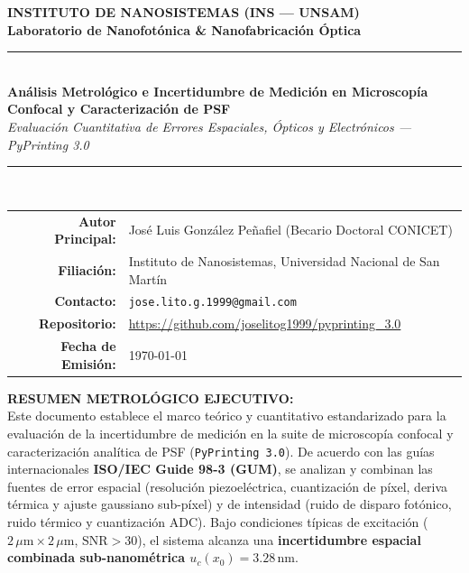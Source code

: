 \documentclass[11pt,a4paper]{article}
\begin{document}
\begin{center}
    {\Large \bfseries \color{NavyBlue} INSTITUTO DE NANOSISTEMAS (INS --- UNSAM)}\\[3pt]
    {\large \bfseries \color{MediumBlue} Laboratorio de Nanofotónica \& Nanofabricación Óptica}\\[8pt]
    \rule{\linewidth}{1.2pt}\\[10pt]
    {\LARGE \bfseries \color{NavyBlue} Análisis Metrológico e Incertidumbre de Medición en Microscopía Confocal y Caracterización de PSF}\\[6pt]
    {\large \itshape \color{TealAccent} Evaluación Cuantitativa de Errores Espaciales, Ópticos y Electrónicos --- PyPrinting 3.0}\\[10pt]
    \rule{\linewidth}{0.6pt}\\[8pt]
    
    \begin{tabular}{rl}
        \textbf{Autor Principal:} & José Luis González Peñafiel (Becario Doctoral CONICET) \\
        \textbf{Filiación:} & Instituto de Nanosistemas, Universidad Nacional de San Martín \\
        \textbf{Contacto:} & \texttt{jose.lito.g.1999@gmail.com} \\
        \textbf{Repositorio:} & \url{https://github.com/joselitog1999/pyprinting_3.0} \\
        \textbf{Fecha de Emisión:} & \today
    \end{tabular}
\end{center}

\vspace{0.5cm}

\begin{resumenbox}
    \textbf{\color{NavyBlue} RESUMEN METROLÓGICO EJECUTIVO:}\\
    Este documento establece el marco teórico y cuantitativo estandarizado para la evaluación de la incertidumbre de medición en la suite de microscopía confocal y caracterización analítica de PSF (\texttt{PyPrinting 3.0}). De acuerdo con las guías internacionales \textbf{ISO/IEC Guide 98-3 (GUM)}, se analizan y combinan las fuentes de error espacial (resolución piezoeléctrica, cuantización de píxel, deriva térmica y ajuste gaussiano sub-píxel) y de intensidad (ruido de disparo fotónico, ruido térmico y cuantización ADC). Bajo condiciones típicas de excitación ($2\,\mu\text{m} \times 2\,\mu\text{m}$, $\text{SNR} > 30$), el sistema alcanza una \textbf{incertidumbre espacial combinada sub-nanométrica $u_c(x_0) = 3.28\,\text{nm}$}.
\end{resumenbox}
\end{document}
